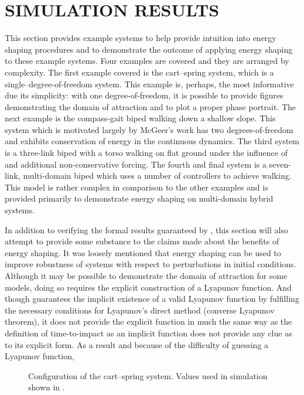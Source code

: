 \chapter{\uppercase{Simulation Results}} \label{chap:simulations}

This section provides example systems to help provide intuition into energy
shaping procedures and to demonstrate the outcome of applying energy shaping to
these example systems.
% 
Four examples are covered and they are arranged by complexity.
% 
The first example covered is the cart--spring system, which is a
single--degree-of-freedom system.
% 
This example is, perhaps, the most informative due its simplicity:
% 
with one degree-of-freedom, it is possible to provide figures demonstrating the
domain of attraction and to plot a proper phase portrait.
% 
The next example is the compass-gait biped walking down a shallow slope.
% 
This system which is motivated largely by McGeer's work \cite{McGeer1990} has
two degrees-of-freedom and exhibits conservation of energy in the continuous
dynamics.
% 
The third system is a three-link biped with a torso walking on flat ground under
the influence of \cs \cite{Spong2005} and additional
non-conservative forcing.
% 
The fourth and final system is a seven-link, multi-domain biped which uses a
number of controllers to achieve walking.
% 
This model is rather complex in comparison to the other examples and is provided
primarily to demonstrate energy shaping on multi-domain hybrid systems.

In addition to verifying the formal results guaranteed by
, this section will also attempt to provide some
substance to the claims made about the benefits of energy shaping.
% 
It was loosely mentioned that energy shaping can be used to improve robustness
of systems with respect to perturbations in initial conditions.
% 
Although it may be possible to demonstrate the domain of attraction for some
models, doing so requires the explicit construction of a Lyapunov function.
% 
And though  guarantees the implicit existence of a
valid Lyapunov function by fulfilling the necessary conditions for Lyapunov's
direct method (converse Lyapunov theorem), it does not provide the explicit
function in much the same way as the definition of time-to-impact as an implicit
function does not provide any clue as to its explicit form.
% 
As a result and because of the difficulty of guessing a Lyapunov function, 




\begin{figure}[t!]
  \centering
  \def\svgwidth{0.7\columnwidth}
  
  \caption[Configuration of the cart--spring system.]{Configuration of the
    cart--spring system. Values used in simulation shown in .}
  \label{fig:cart-spring-configuration}
\end{figure}

